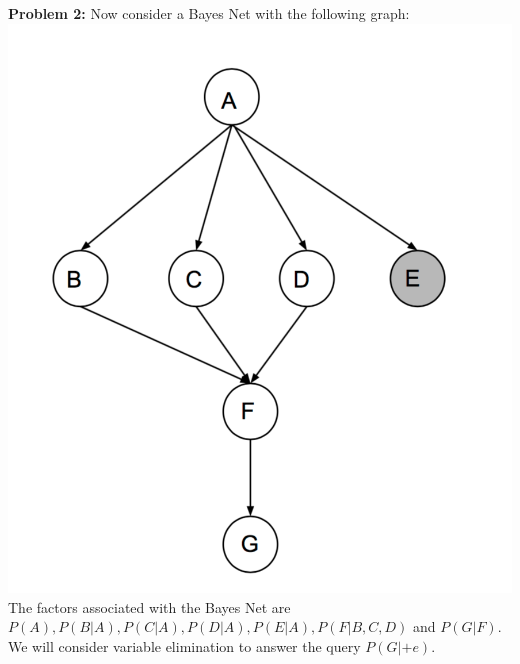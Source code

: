 \documentclass[a4paper]{article}
\begin{document}
    \noindent \textbf{Problem 2:} Now consider a Bayes Net with the following graph:\\
    \includegraphics[scale=0.4]{figs/net2.png}\\
    The factors associated with the Bayes Net are $P(A), P(B | A), P(C | A), P(D | A), P(E | A), P(F | B,C,D)$ and $P (G | F )$. We will consider variable elimination to answer the query $P (G | +e)$.
\end{document}
